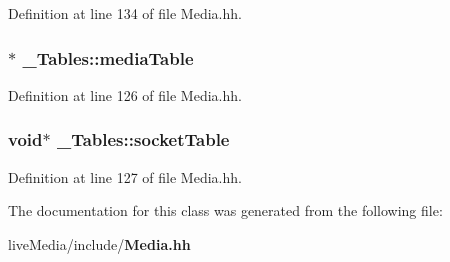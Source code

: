 Definition at line 134 of file Media.\+hh.

\subsubsection[{media\+Table}]{$\ast$ \+\_\+\+Tables\+::media\+Table}\label{class__Tables_a28010788f002e74a6cf67556a5ae7f1e}


Definition at line 126 of file Media.\+hh.

\subsubsection[{socket\+Table}]{\setlength{\rightskip}{0pt plus 5cm}void$\ast$ \+\_\+\+Tables\+::socket\+Table}\label{class__Tables_a50cc0d1302ba888262fba5fc5abc5a4d}


Definition at line 127 of file Media.\+hh.



The documentation for this class was generated from the following file\+:\begin{DoxyCompactItemize}
\item 
live\+Media/include/{\bf Media.\+hh}\end{DoxyCompactItemize}

